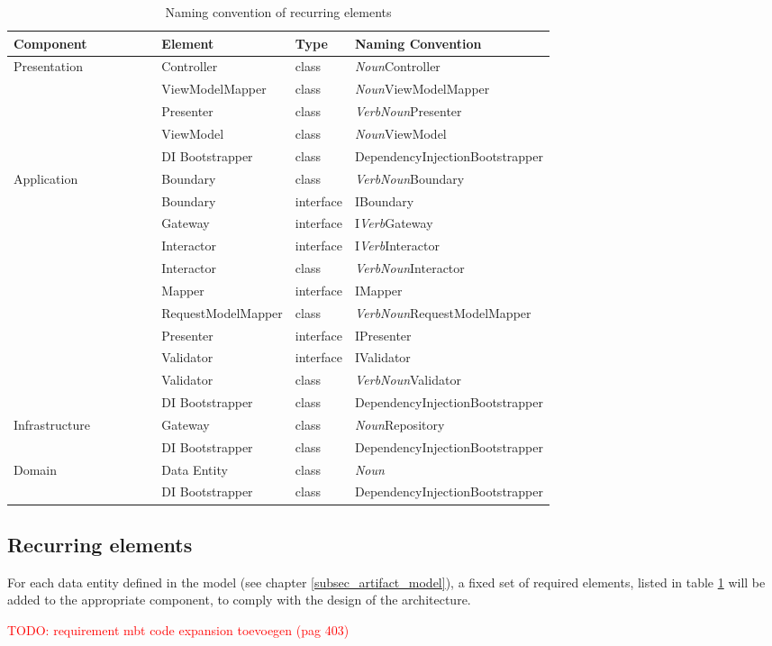 \begin{table}[ht]
    \small
    \begin{tabular}{ l p{0.24\linewidth} p{0.09\linewidth} p{0.37\linewidth} }
    \hline
    \textbf{Component} & \textbf{Element} & \textbf{Type} & \textbf{Naming Convention} \\ \hline
    Presentation & Controller & class & \textit{Noun}Controller \\
    & ViewModelMapper & class & \textit{Noun}ViewModelMapper \\
    & Presenter & class & \textit{VerbNoun}Presenter \\
    & ViewModel & class & \textit{Noun}ViewModel \\
    & DI Bootstrapper & class & DependencyInjectionBootstrapper \\ \hline

    Application & Boundary & class & \textit{VerbNoun}Boundary \\
    & Boundary  & interface & IBoundary \\
    & Gateway  & interface & I\textit{Verb}Gateway \\
    & Interactor  & interface & I\textit{Verb}Interactor \\
    & Interactor & class & \textit{VerbNoun}Interactor \\
    & Mapper  & interface & IMapper \\
    & RequestModelMapper & class & \textit{VerbNoun}RequestModelMapper \\
    & Presenter  & interface & IPresenter \\
    & Validator  & interface & IValidator \\
    & Validator & class & \textit{VerbNoun}Validator \\
    & DI Bootstrapper & class & DependencyInjectionBootstrapper \\ \hline
    
    Infrastructure & Gateway & class & \textit{Noun}Repository \\
    & DI Bootstrapper & class & DependencyInjectionBootstrapper \\ \hline

    Domain & Data Entity & class & \textit{Noun} \\
    & DI Bootstrapper & class & DependencyInjectionBootstrapper \\ \hline

    \end{tabular}
    \caption{Naming convention of recurring elements}
    \label{table:element_naming_convention}
\end{table}

    \subsection{Recurring elements}
    
    For each data entity defined in the model (see chapter \ref{subsec_artifact_model}), a
    fixed set of required elements, listed in table \ref{table:element_naming_convention}
    will be added to the appropriate component, to comply with the design of the
    architecture.

    \textcolor{red}{TODO: requirement mbt code expansion toevoegen (pag 403)}